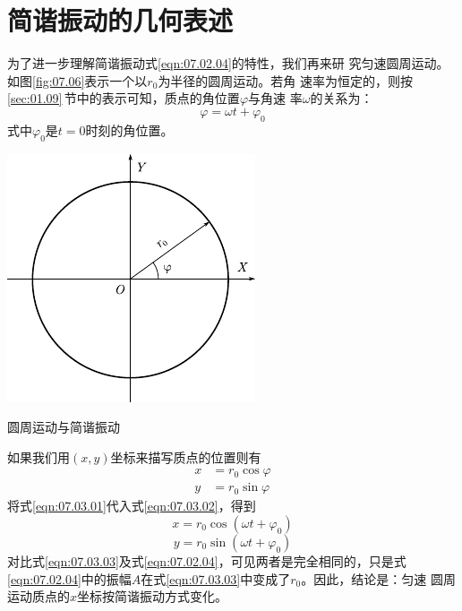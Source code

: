 \section{简谐振动的几何表述}\label{sec:07.03}

为了进一步理解简谐振动\lhbrak 式\eqref{eqn:07.02.04}\rhbrak 的特性，我们再来研
究匀速圆周运动。如图\ref{fig:07.06}\;表示一个以$ r _ { 0 } $为半径的圆周运动。若角
速率为恒定的，则按\ref{sec:01.09}\,节中的表示可知，质点的角位置$ \varphi $与角速
率$ \omega $的关系为：
\begin{equation}\label{eqn:07.03.01}
	\varphi = \omega t + \varphi _ { 0 }
\end{equation}
式中$ \varphi _ { 0 } $是$  t = 0   $时刻的角位置。

\begin{figurex}
    \centering
    \includegraphics{figure/fig07.06}
    \caption{圆周运动与简谐振动}
    \label{fig:07.06}
\end{figurex}

如果我们用$ \left(x, y\right) $坐标来描写质点的位置则有
\begin{equation}\label{eqn:07.03.02}
	\begin{aligned}
	x &= r _ { 0 } \cos \varphi  \\
	y &= r _ { 0 } \sin \varphi
	\end{aligned}
\end{equation}
将式\eqref{eqn:07.03.01}代入式\eqref{eqn:07.03.02}，得到
\begin{equation*}
    x = r _ { 0 } \cos \left( \omega t + \varphi _ { 0 } \right)
\end{equation*}
\begin{equation}\label{eqn:07.03.03}
    y = r _ { 0 } \sin \left( \omega t + \varphi _ { 0 } \right)
\end{equation}
对比式\eqref{eqn:07.03.03}及式\eqref{eqn:07.02.04}，可见两者是完全相同的，只是式
\eqref{eqn:07.02.04}中的振幅$ A $在式\eqref{eqn:07.03.03}中变成了$ r _ { 0 } $。因此，结论是：匀速
圆周运动质点的$ x $坐标按简谐振动方式变化。

